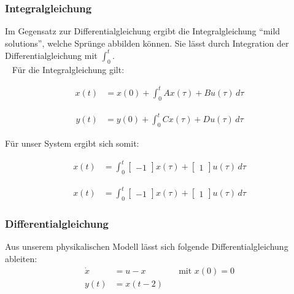 \subsubsection{Integralgleichung}
Im Gegensatz zur Differentialgleichung ergibt die Integralgleichung \enquote{mild solutions}, welche Sprünge abbilden können. Sie lässt durch Integration der Differentialgleichung mit $\int_{0}^{t}$. \\ 
Für die Integralgleichung gilt:

\noindent
\begin{minipage}{.5\linewidth}   
    \begin{align*}
        x(t) & = x(0) + \int_{0}^{t} Ax(\tau) + Bu(\tau)\,d\tau
    \end{align*}
\end{minipage}
\begin{minipage}{.5\linewidth}   
    \begin{align*}
        y(t) & = y(0) + \int_{0}^{t} Cx(\tau) + Du(\tau)\,d\tau
    \end{align*}
\end{minipage}

Für unser System ergibt sich somit:

\noindent
\begin{minipage}{.5\linewidth}   
    \begin{align*}
        x(t) & = \int_{0}^{t} \begin{bmatrix}
            -1
        \end{bmatrix}x(\tau) + \begin{bmatrix}
            1
        \end{bmatrix}u(\tau)\,d\tau
    \end{align*}
\end{minipage}
\begin{minipage}{.5\linewidth}   
    \begin{align*}
        x(t) & = \int_{0}^{t} \begin{bmatrix}
            -1
        \end{bmatrix}x(\tau) + \begin{bmatrix}
            1
        \end{bmatrix}u(\tau)\,d\tau
    \end{align*}
\end{minipage}

\subsubsection{Differentialgleichung}
Aus unserem physikalischen Modell lässt sich folgende Differentialgleichung ableiten:
\begin{align*}
    \dot x & = u - x \enspace \enspace \enspace \enspace \enspace \enspace \enspace \text { mit } x(0) = 0\\
    y(t) & = x(t - 2) \\
\end{align*}

